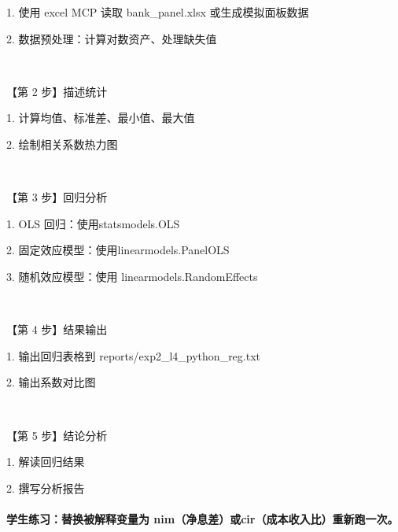 \documentclass[
  american,
  chinese,
]{ctexart}
\begin{document}
\foreignlanguage{american}{1. }{使用}\foreignlanguage{american}{ excel MCP }{读取}\foreignlanguage{american}{ bank\_panel.xlsx }{或生成模拟面板数据}\foreignlanguage{american}{}

\foreignlanguage{american}{2. }{数据预处理：计算对数资产、处理缺失值}\foreignlanguage{american}{}

\foreignlanguage{american}{}

~

{【第}\foreignlanguage{american}{ 2 }{步】描述统计}\foreignlanguage{american}{}

\foreignlanguage{american}{1. }{计算均值、标准差、最小值、最大值}\foreignlanguage{american}{}

\foreignlanguage{american}{2. }{绘制相关系数热力图}\foreignlanguage{american}{}

\foreignlanguage{american}{}

~

{【第}\foreignlanguage{american}{ 3 }{步】回归分析}\foreignlanguage{american}{}

\foreignlanguage{american}{1. OLS }{回归：使用}\foreignlanguage{american}{ {statsmodels.OLS}}

\foreignlanguage{american}{2. }{固定效应模型：使用}\foreignlanguage{american}{ {linearmodels.PanelOLS}}

\foreignlanguage{american}{3. }{随机效应模型：使用}{ {\foreignlanguage{american}{linearmodels.RandomEffects}}\foreignlanguage{american}{}}

\foreignlanguage{american}{}

~

{【第}\foreignlanguage{american}{ 4 }{步】结果输出}\foreignlanguage{american}{}

\foreignlanguage{american}{1. }{输出回归表格到}\foreignlanguage{american}{
reports/exp2\_l4\_python\_reg.txt}

\foreignlanguage{american}{2. }{输出系数对比图}\foreignlanguage{american}{}

\foreignlanguage{american}{}

~

{【第}\foreignlanguage{american}{ 5 }{步】结论分析}\foreignlanguage{american}{}

\foreignlanguage{american}{1. }{解读回归结果}\foreignlanguage{american}{}

\foreignlanguage{american}{2. }{撰写分析报告}\foreignlanguage{american}{}

\paragraph{\texorpdfstring{{学生练习：替换被解释变量为}\foreignlanguage{american}{ nim}{（净息差）或}\foreignlanguage{american}{ {cir}}{（成本收入比）重新跑一次。}\foreignlanguage{american}{}}{学生练习：替换被解释变量为 nim（净息差）或 cir（成本收入比）重新跑一次。}}\label{ux5b66ux751fux7ec3ux4e60ux66ffux6362ux88abux89e3ux91caux53d8ux91cfux4e3a-nimux51c0ux606fux5deeux6216-cirux6210ux672cux6536ux5165ux6bd4ux91cdux65b0ux8dd1ux4e00ux6b21}
\end{document}
